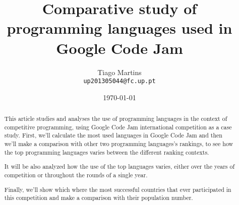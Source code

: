 \documentclass{article}
\begin{document}
\title{Comparative study of programming languages used in Google Code Jam}

\author{Tiago Martins\\ \texttt{up201305044@fc.up.pt} \\
}

\date{\today}

\maketitle


\begin{abstract}

This article studies and analyses the use of programming languages in the context of competitive programming, using Google Code Jam international competition as a case study. First, we'll calculate the most used languages in Google Code Jam and then we'll make a comparison with other two programming languages's rankings, to see how the top programming languages varies between the different ranking contexts.

It will be also analyzed how the use of the top languages varies, either over the years of competition or throughout the rounds of a single year.

Finally, we'll show which where the most successful countries that ever participated in this competition and make a comparison with their population number.


\vspace{5mm}
\end{abstract}

\end{document}
